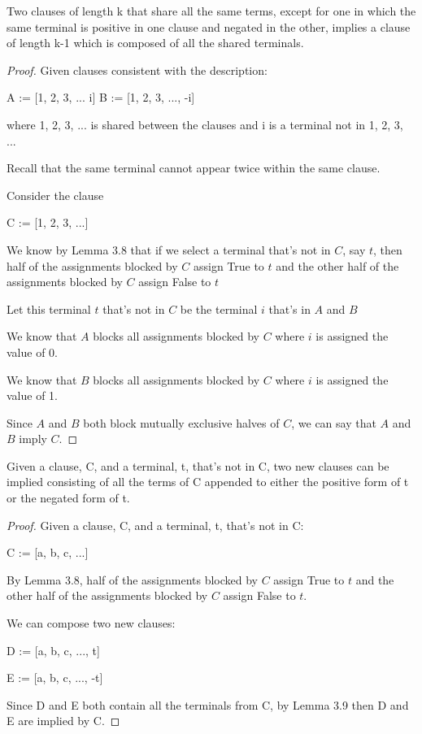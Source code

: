 \documentclass[manuscript]{acmart}
\begin{document}
    \begin{lemma}
        Two clauses of length k that share all the same terms, except for one in which
        the same terminal is positive in one clause and negated in the other, implies
        a clause of length k-1 which is composed of all the shared terminals.
    \end{lemma}
    \begin{proof}
        Given clauses consistent with the description:

        A := [1, 2, 3, ... i]
        B := [1, 2, 3, ..., -i]

        where 1, 2, 3, ... is shared between the clauses and i is a terminal not in
        1, 2, 3, ...

        Recall that the same terminal cannot appear twice within the same clause.

        Consider the clause

        C := [1, 2, 3, ...]

        We know by Lemma 3.8 that if we select a terminal that's not in $C$, say $t$, 
        then half of the assignments blocked by $C$ assign True to $t$ and the other
        half of the assignments blocked by $C$ assign False to $t$

        Let this terminal $t$ that's not in $C$ be the terminal $i$ that's in $A$ and $B$

        We know that $A$ blocks all assignments blocked by $C$ where $i$ is assigned
        the value of 0.

        We know that $B$ blocks all assignments blocked by $C$ where $i$ is assigned
        the value of 1.

        Since $A$ and $B$ both block mutually exclusive halves of $C$, we can
        say that $A$ and $B$ imply $C$.

    \end{proof}

    \begin{lemma}
        Given a clause, C, and a terminal, t, that's not in C, two new clauses
        can be implied consisting of all the terms of C appended to either 
        the positive form of t or the negated form of t.
    \end{lemma}
    \begin{proof}
        Given a clause, C, and a terminal, t, that's not in C:

        C := [a, b, c, ...]

        By Lemma 3.8, half of the assignments blocked by $C$ assign True to $t$
        and the other half of the assignments blocked by $C$ assign False to $t$.

        We can compose two new clauses:

        D := [a, b, c, ..., t]

        E := [a, b, c, ..., -t]

        Since D and E both contain all the terminals from C, by Lemma 3.9 then
        D and E are implied by C.
        
    \end{proof}
\end{document}
